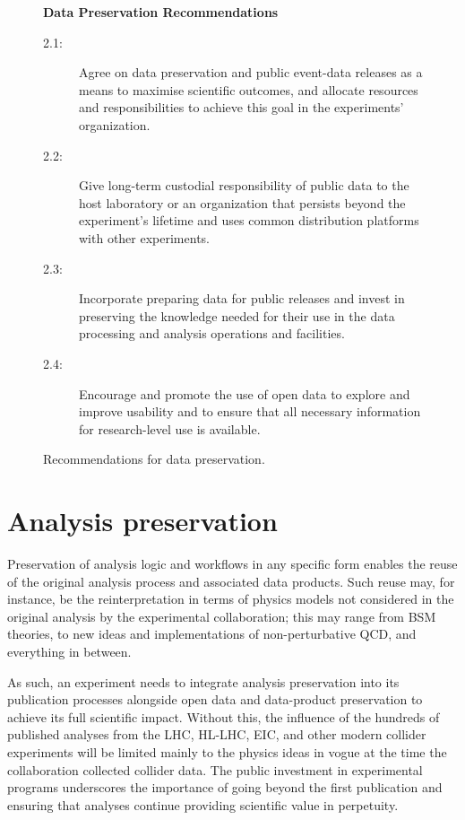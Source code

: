 \documentclass[11pt]{article}
\begin{document}
\begin{figure}[!ht]
\begin{tcolorbox}
\begin{center}
{\large \textbf{Data Preservation Recommendations}}
\end{center}
%
\begin{description}
   \item[2.1:] Agree on \gls{data preservation} and public event-data releases as a means to maximise scientific outcomes, and allocate resources and responsibilities to achieve this goal in the experiments' organization.    \item[2.2:] Give long-term custodial responsibility of public \gls{data} to the host laboratory or an organization that persists beyond the experiment's lifetime and uses common distribution platforms with other experiments.
   \item[2.3:] Incorporate preparing \gls{data} for public releases and invest in preserving the knowledge needed for their use in the data processing and analysis operations and facilities.
   \item[2.4:] Encourage and promote the use of open data to explore and improve usability and to ensure that all necessary information for research-level use is available.
\end{description}
\end{tcolorbox}
\caption{Recommendations for data preservation.}
\label{fig:recs_opendata}
\end{figure}


\section{Analysis preservation}
\label{sec:analysis-preservation}

Preservation of analysis logic and workflows in any specific form enables the reuse of the original analysis process and associated \glspl{data product}. Such reuse may, for instance, be the \gls{reinterpretation} in terms of physics models not considered in the original analysis by the experimental collaboration; this may range from \gls{BSM} theories, to new ideas and implementations of non-perturbative \gls{QCD}, and everything in between.

As such, an experiment needs to integrate analysis preservation into its publication processes alongside open data and data-product preservation to achieve its full scientific impact. Without this, the influence of the hundreds of published analyses from the \gls{LHC}, \gls{HL-LHC}, \gls{EIC}, and other modern collider experiments will be limited mainly to the physics ideas in vogue at the time the collaboration collected collider data. The public investment in experimental programs underscores the importance of going beyond the first publication and ensuring that analyses continue providing scientific value in perpetuity.
\end{document}
